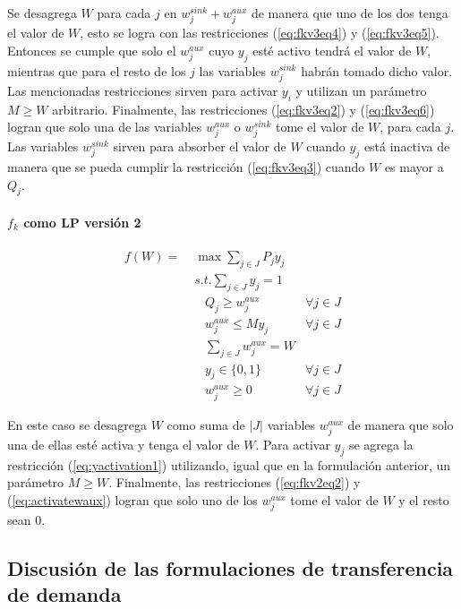 Se desagrega $W$ para cada $j$ en $w^{sink}_j + w^{aux}_j$ de manera que uno de los dos tenga el valor de $W$, esto se logra con las restricciones (\ref{eq:fkv3eq4}) y (\ref{eq:fkv3eq5}). Entonces se cumple que solo el $w^{aux}_j$ cuyo $y_j$ esté activo tendrá el valor de $W$, mientras que para el resto de los $j$ las variables $w^{sink}_j$ habrán tomado dicho valor. Las mencionadas restricciones sirven para activar $y_i$ y utilizan un parámetro $M \geq W$ arbitrario. Finalmente, las restricciones (\ref{eq:fkv3eq2}) y (\ref{eq:fkv3eq6}) logran que solo una de las variables $w^{aux}_j$ o $w^{sink}_j$ tome el valor de $W$, para cada $j$. Las variables $w^{sink}_j$ sirven para absorber el valor de $W$ cuando $y_j$ está inactiva de manera que se pueda cumplir la restricción (\ref{eq:fkv3eq3}) cuando $W$ es mayor a $Q_j$.

\paragraph*{$f_k$ como LP versión 2}

\begin{align}
  f(W) =\; & \max \sum_{j \in J} P_j y_j             & \label{eq:fkv2eq1}\\
           & s.t. \sum_{j \in J} y_j = 1            & \label{eq:fkv2eq2}\\
           & \;\;\; Q_j \geq w^{aux}_j              & \forall j \in J \label{eq:implfkoriginalineq} \\
           & \;\;\; w^{aux}_j \leq M y_j            & \forall j \in J \label{eq:yactivation1} \\
           & \;\;\; \sum_{j \in J} w^{aux}_j = W    & \label{eq:activatewaux} \\
           & \;\;\; y_j \in \{0,1\}                 & \label{eq:fkv2domainy} \forall j \in J\\
           & \;\;\; w^{aux}_j \geq 0                & \label{eq:fkv2eq6} \forall j \in J
\end{align}

En este caso se desagrega $W$ como suma de $|J|$ variables $w^{aux}_j$ de manera que solo una de ellas esté activa y tenga el valor de $W$. Para activar $y_j$ se agrega la restricción (\ref{eq:yactivation1}) utilizando, igual que en la formulación anterior, un parámetro $M \geq W$. Finalmente, las restricciones (\ref{eq:fkv2eq2}) y (\ref{eq:activatewaux}) logran que solo uno de los $w^{aux}_j$ tome el valor de $W$ y el resto sean 0.

\subsection{Discusión de las formulaciones de transferencia de demanda}

